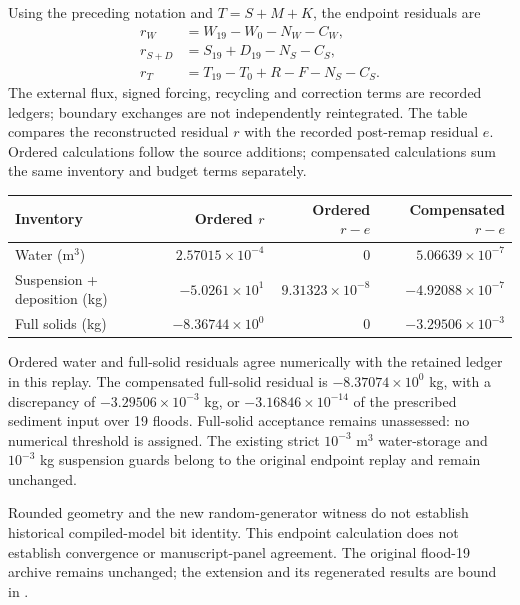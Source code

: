 Using the preceding notation and $T=S+M+K$, the endpoint residuals are
\begin{align*}
 r_W &= W_{19}-W_0-N_W-C_W,\\
 r_{S+D} &= S_{19}+D_{19}-N_S-C_S,\\
 r_T &= T_{19}-T_0+R-F-N_S-C_S.
\end{align*}
The external flux, signed forcing, recycling and correction terms are
recorded ledgers; boundary exchanges are not independently reintegrated.
The table compares the reconstructed residual $r$ with the recorded
post-remap residual $e$. Ordered calculations follow the source additions;
compensated calculations sum the same inventory and budget terms separately.
\begin{center}\small
\begin{tabular}{lrrr}
\toprule
Inventory & Ordered $r$ & Ordered $r-e$ & Compensated $r-e$ \\
\midrule
Water (m$^3$) & $2.57015\times10^{-4}$ & $0$ & $5.06639\times10^{-7}$ \\
Suspension + deposition (kg) & $-5.0261\times10^{1}$ & $9.31323\times10^{-8}$ & $-4.92088\times10^{-7}$ \\
Full solids (kg) & $-8.36744\times10^{0}$ & $0$ & $-3.29506\times10^{-3}$ \\
\bottomrule\end{tabular}\end{center}
Ordered water and full-solid residuals agree numerically with the retained
ledger in this replay. The compensated full-solid residual is
$-8.37074\times10^{0}$ kg, with a discrepancy of $-3.29506\times10^{-3}$ kg, or $-3.16846\times10^{-14}$ of the
prescribed sediment input over 19 floods. Full-solid acceptance remains
unassessed: no numerical threshold is assigned. The existing strict
$10^{-3}$ m$^3$ water-storage and $10^{-3}$ kg suspension guards
belong to the original endpoint replay and remain unchanged.

Rounded geometry and the new random-generator witness do not establish
historical compiled-model bit identity. This endpoint calculation does
not establish convergence or manuscript-panel agreement. The original
flood-19 archive remains unchanged; the extension and its regenerated
results are bound in .

